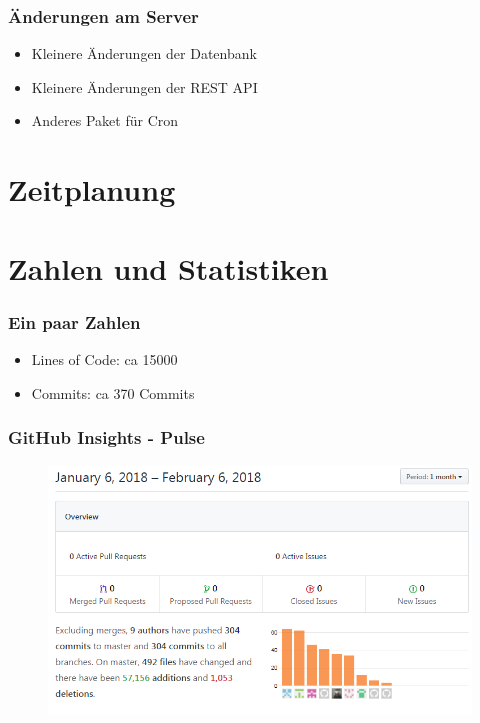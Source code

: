 \documentclass[11pt, usepdftitle=false,...]{beamer}
\begin{document}
	    \begin{frame}
	        \frametitle{Änderungen am Server}
	        \begin{itemize}
	            \item<2-> Kleinere Änderungen der Datenbank
	            \item<3-> Kleinere Änderungen der REST API
	            \item<4-> Anderes Paket für Cron
	        \end{itemize}
	    \end{frame}    	

	\section{Zeitplanung}
	\frame{\sectionpage}
	
	\section{Zahlen und Statistiken}
	\frame{\sectionpage}
	
			\begin{frame}
				\frametitle{Ein paar Zahlen}
				\begin{itemize}
					\item<2-> Lines of Code: ca 15000
					\item<3-> Commits: ca 370 Commits
				\end{itemize}	
			\end{frame}
			
		
			\begin{frame}
				\frametitle{GitHub Insights - Pulse}
				\begin{figure}[ht] 
					\centering
					\includegraphics[scale=0.50, trim= 1cm 0 0 0]{pulse.png}
					\label{fig1}
				\end{figure}
			\end{frame}	
		
\end{document}

